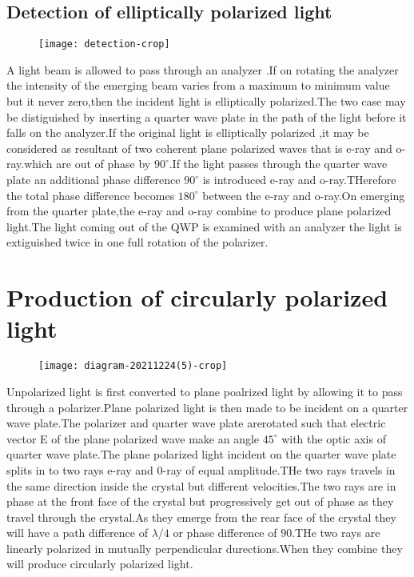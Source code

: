 \subsection{Detection of elliptically polarized light}
\begin{figure}[H]
	\centering
	\texttt{[image: detection-crop]}
	\caption{}
	\label{}
\end{figure}
A light beam is allowed to pass through an analyzer .If on rotating the analyzer the intensity of the emerging beam varies from a maximum to minimum value  but it never zero,then the incident light is elliptically polarized.The two case may be distiguished by inserting a quarter wave plate in the path of the light before it falls on the analyzer.If the original light is elliptically polarized ,it may be considered as resultant of two coherent plane polarized waves that is e-ray and o-ray.which are out of phase by $90^{\circ}$.If the light passes through the quarter wave plate an additional phase difference  $90^{\circ}$ is introduced e-ray and o-ray.THerefore the total phase difference becomes $180^{\circ}$ between the e-ray and o-ray.On emerging from the quarter plate,the e-ray and o-ray combine to produce plane polarized light.The light coming out of the QWP is examined with an analyzer the light is extiguished twice in one full rotation of the polarizer.
\section{Production of circularly polarized light}
\begin{figure}[H]
	\centering
	\texttt{[image: diagram-20211224(5)-crop]}
	\caption{}
	\label{}
\end{figure}
Unpolarized light is first converted to plane poalrized light by allowing it to pass through a polarizer.Plane polarized light is then made to be incident on a quarter wave plate.The polarizer and quarter wave plate arerotated such that electric vector E of the plane polarized wave make an angle $45^{\circ}$ with the optic axis of quarter wave plate.The plane polarized light incident on the quarter wave plate splits in to two rays e-ray and 0-ray of equal amplitude.THe two rays travels in the same direction inside the crystal but different velocities.The two rays are in phase at the front face of the crystal but progressively get out of phase as they travel through the crystal.As they emerge from the rear face of the crystal they will have a path difference of $\lambda/4$ or phase difference of $90$.THe two rays are linearly polarized in mutually perpendicular durections.When they combine they will produce circularly polarized light.
